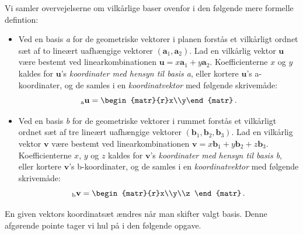 Vi samler overvejelserne om vilkårlige baser ovenfor i den følgende mere formelle defintion:

\begin{definition}
\begin{itemize}
\item
Ved en basis \textit{a} for de geometriske vektorer i planen forstås et vilkårligt ordnet sæt af to lineært uafhængige vektorer $(\mathbf a_1,\mathbf a_2)$. Lad en vilkårlig vektor $\mathbf u$ være bestemt ved linearkombinationen $\mathbf u=x\mathbf a_1+y\mathbf a_2$. Koefficienterne $x$ og $y$ kaldes for $\mathbf u$'s \textit{koordinater med hensyn til basis a}, eller kortere $\mathbf u$'s a-koordinater, og de samles i en \textit{koordinatvektor} med følgende skrivemåde:
\begin{equation}
_\mathrm a\mathbf u=
\begin{matr}{r}x\\y\end{matr}\,.
\end{equation}
\item
Ved en basis \textit{b} for de geometriske vektorer i rummet forstås et vilkårligt ordnet sæt af tre lineært uafhængige vektorer $(\mathbf b_1,\mathbf b_2,\mathbf b_3)$. Lad en vilkårlig vektor $\mathbf v$ være bestemt ved linearkombinationen $\mathbf v=x\mathbf b_1+y\mathbf b_2+z\mathbf b_3$. Koefficienterne $x$, $y$ og $z$ kaldes for $\mathbf v$'s \textit{koordinater med hensyn til basis b}, eller kortere $\mathbf v$'s b-koordinater, og de samles i en \textit{koordinatvektor} med følgende skrivemåde:
\begin{equation}
_\mathrm b \mathbf v=
\begin{matr}{r}x\\y\\z \end{matr}\,.
\end{equation}
\end{itemize}
\end{definition}

En given vektors koordinatsæt ændres når man skifter valgt basis. Denne afgørende pointe tager vi hul på i den følgende opgave.

